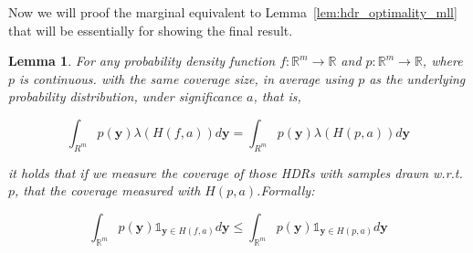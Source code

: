 \documentclass{article}
\newtheorem{lemma}[theorem]{Lemma}
\theoremstyle{definition}
\begin{document}
Now we will proof the marginal equivalent to Lemma~\ref{lem:hdr_optimality_mll} that will be essentially for showing the final result.
\begin{lemma}
For any probability density function $f: \mathbb{R}^m \to \mathbb{R}$ and $p: \mathbb{R}^m \to \mathbb{R}$, where $p$ is continuous. with the same coverage size, in average using $p$ as the underlying probability distribution, under significance $a$, that is,

$$\int_{R^m} p(\mathbf{y}) \lambda(H(f, a)) d \mathbf{y} = \int_{R^m} p(\mathbf{y}) \lambda(H(p, a)) d \mathbf{y}$$

it holds that if we measure the coverage of those HDRs with samples drawn w.r.t. $p$, that the coverage measured with $H(p,a)$.Formally:

$$\int_{\mathbb{R}^{m}} p(\mathbf{y}) \mathds1_{\mathbf{y} \in H(f, a)} d \mathbf{y} \leq \int_{\mathbb{R}^{m}} p(\mathbf{y}) \mathds1_{\mathbf{y} \in H(p, a)} d \mathbf{y}$$
\end{lemma}
\end{document}
